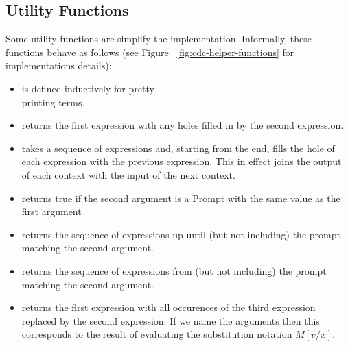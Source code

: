 \subsection{Utility Functions}
Some utility functions are simplify the implementation.
Informally, these functions behave as follows (see Figure ~\ref{fig:cdc-helper-functions} for implementations details):

\begin{itemize}\itemsep0.1cm

\item {} is defined inductively for pretty-\\ printing terms.

\item {} returns the first expression with any holes filled in by the second expression.

\item {} takes a sequence of expressions and, starting from the end, 
fills the hole of each expression with the previous expression. 
This in effect joins the output of each context with the input of the next context.

\item {} returns true if the second argument is a Prompt with the same value as the first argument

\item {} returns the sequence of expressions up until (but not including) the prompt matching the second argument.

\item {} returns the sequence of expressions from (but not including) the prompt matching the second argument.

\item {} returns the first expression with all occurences of the third expression replaced by the second expression. 
If we name the arguments  then this corresponds to the result of evaluating the substitution notation $M[v/x]$.
\end{itemize}

